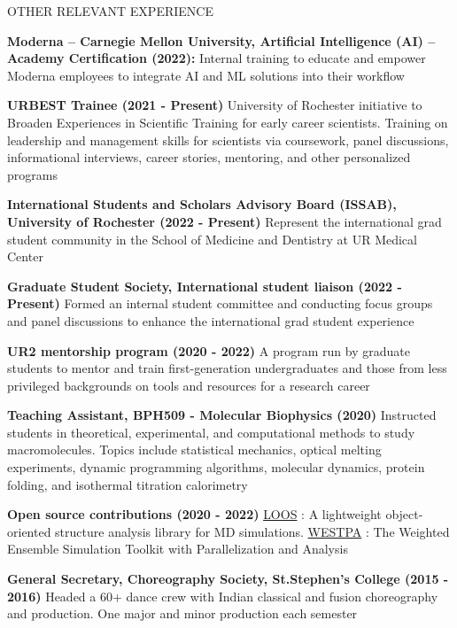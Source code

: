 \documentclass{resume} %
\begin{document}

\begin{rSection}{OTHER RELEVANT EXPERIENCE}
   \vspace{-1.25em}
   \item \textbf{Moderna – Carnegie Mellon University, Artificial Intelligence (AI) – Academy Certification (2022):} {
      Internal training to educate and empower Moderna employees to integrate AI and ML solutions into their workflow}
   \item \textbf{URBEST Trainee (2021 - Present)} {University of Rochester initiative to Broaden Experiences in Scientific Training for early career scientists. Training on leadership and management skills for scientists via coursework, panel discussions, informational interviews, career stories, mentoring, and other personalized programs}
   \item \textbf{International Students and Scholars Advisory Board (ISSAB), University of Rochester (2022 - Present)} {Represent the international grad student community in the School of Medicine and Dentistry at UR Medical Center}
   \item \textbf{Graduate Student Society, International student liaison (2022 - Present)} {Formed an internal student committee and conducting focus groups and panel discussions to enhance the international grad student experience}
   \item \textbf{UR2 mentorship program (2020 - 2022)} {A program run by graduate students to mentor and train first-generation undergraduates and those from less privileged backgrounds on tools and resources for a research career}
   \item \textbf{Teaching Assistant, BPH509 - Molecular Biophysics (2020)} {Instructed students in theoretical, experimental, and computational methods to study macromolecules. Topics include statistical mechanics, optical melting experiments, dynamic
      programming algorithms, molecular dynamics, protein folding, and isothermal titration calorimetry
   }
   \item \textbf{Open source contributions (2020 - 2022)} {\href{https://github.com/GrossfieldLab/loos}{LOOS} : A lightweight object-oriented structure analysis library for MD simulations.
      \href{https://github.com/westpa/westpa}{WESTPA} : The Weighted Ensemble Simulation Toolkit with Parallelization and Analysis}
   \item \textbf{General Secretary, Choreography Society, St.Stephen's College (2015 - 2016)} {Headed a 60+ dance crew with Indian classical and fusion choreography and production. One major and minor production each semester }
\end{rSection}
\end{document}
